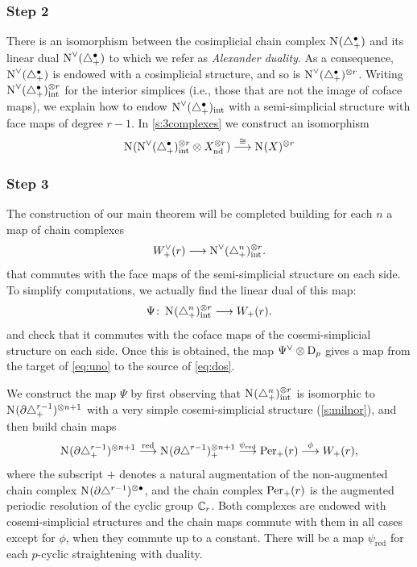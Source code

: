 \subsubsection*{Step 2} There is an isomorphism between the cosimplicial chain complex $\operatorname{N}_{}(\triangle_{+}^{\bullet})$ and its linear dual $\operatorname{N}^\vee_{}(\triangle_{+}^{\bullet})$ to which we refer as \emph{Alexander duality}. As a consequence, $\operatorname{N}^\vee_{}(\triangle_{+}^{\bullet})$ is endowed with a cosimplicial structure, and so is $\operatorname{N}^\vee_{}(\triangle_{+}^{\bullet})^{\otimes r}$. Writing $\operatorname{N}^\vee_{}(\triangle_{+}^{\bullet})_{\mathrm{int}}^{\otimes r}$ for the interior simplices (i.e., those that are not the image of coface maps), we explain how to endow $\operatorname{N}^\vee_{}(\triangle_{+}^{\bullet})_{\mathrm{int}}$ with a semi-simplicial structure with face maps of degree $r-1$. In \cref{s:3complexes} we construct an isomorphism
\begin{equation}\label{eq:dos}
	 \operatorname{N}_{}(\operatorname{N}^\vee_{}(\triangle_{+}^{\bullet})_{\mathrm{int}}^{\otimes r}\otimes X_{\mathrm{nd}}^{\otimes r})
	 \overset{\cong}{\longrightarrow}
	 \operatorname{N}_{}(X)^{\otimes r}
\end{equation}

\subsubsection*{Step 3} The construction of our main theorem will be completed building for each $n$ a map of chain complexes 
\[
W^\vee_+(r)\longrightarrow \operatorname{N}^\vee_{}(\triangle_{+}^{n})^{\otimes r}_{\mathrm{int}}.
\]
that commutes with the face maps of the semi-simplicial structure on each side. To simplify computations, we actually find the linear dual of this map:
\[
	\Psi\colon \operatorname{N}_{}(\triangle_{+}^n)_{\mathrm{int}}^{\otimes r}\longrightarrow W_+(r). 
\]
and check that it commutes with the coface maps of the cosemi-simplicial structure on each side. Once this is obtained, the map $\Psi^{\vee}\otimes \mathrm{D}_p$ gives a map from the target of \eqref{eq:uno} to the source of \eqref{eq:dos}.

We construct the map $\Psi$ by first observing that $\operatorname{N}_{}(\triangle_{+}^n)_{\mathrm{int}}^{\otimes r}$ is isomorphic to $\operatorname{N}_{}(\partial\triangle_{+}^{r-1})^{\otimes n+1}$ with a very simple cosemi-simplicial structure (\cref{s:milnor}), and then build chain maps
\[
	\operatorname{N}_{}(\partial\triangle_{+}^{r-1})^{\otimes n+1}
	\overset{\mathrm{red}}{\longrightarrow}
	\operatorname{N}_{}(\partial\triangle^{r-1})^{\otimes n+1}_+
	\overset{\psi_{\mathrm{red}}}{\longrightarrow}
	\mathrm{Per}_+(r)
	\overset{\phi}{\longrightarrow} 
	W_+(r),
\]
where the subscript $+$ denotes a natural augmentation of the non-augmented chain complex $\operatorname{N}_{}(\partial\triangle^{r-1})^{\otimes \bullet}$, and the chain complex $\mathrm{Per}_+(r)$ is the augmented periodic resolution of the cyclic group $\mathbb{C}_r$. Both complexes are endowed with cosemi-simplicial structures and the chain maps commute with them in all cases except for $\phi$, when they commute up to a constant. There will be a map $\psi_{\mathrm{red}}$ for each $p$-cyclic straightening with duality. 

